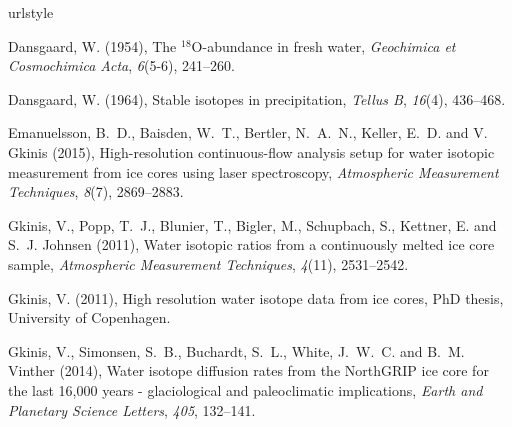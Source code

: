 \documentclass[draft, jgrga]{AGUTeX}
\begin{document}
\begin{article}




\begin{thebibliography}{}

\providecommand{\natexlab}[1]{#1}
\expandafter\ifx\csname urlstyle\endcsname\relax
  \providecommand{\doi}[1]{doi:\discretionary{}{}{}#1}\else
  \providecommand{\doi}{doi:\discretionary{}{}{}\begingroup
  \urlstyle{rm}\Url}\fi


 Dansgaard, W. (1954),
The $^{18}${O}-abundance in fresh water,
\textit{Geochimica et Cosmochimica Acta}, \textit{6}(5-6), 241--260.

 Dansgaard, W. (1964),
Stable isotopes in precipitation,
\textit{Tellus B}, \textit{16}(4), 436--468.

Emanuelsson, B.~D., Baisden, W.~T., Bertler, N.~A.~N., Keller, E.~D. and V. Gkinis (2015),
High-resolution continuous-flow analysis setup for water isotopic measurement from ice cores using laser spectroscopy,
\textit{Atmospheric Measurement Techniques}, \textit{8}(7), 2869--2883.

Gkinis, V., Popp, T.~J., Blunier, T., Bigler, M., Schupbach, S., Kettner, E. and S.~J. Johnsen (2011),
Water isotopic ratios from a continuously melted ice core sample,
\textit{Atmospheric Measurement Techniques}, \textit{4}(11), 2531--2542.

Gkinis, V. (2011),
{ High resolution water isotope data from ice cores},
PhD thesis, University of Copenhagen.

Gkinis, V., Simonsen, S.~B., Buchardt, S.~L., White, J.~W.~C. and  B.~M. Vinther (2014),
{Water isotope diffusion rates from the NorthGRIP ice core for the last 16,000 years - glaciological and paleoclimatic implications},
\textit{Earth and Planetary Science Letters}, \textit{405}, 132--141.


\end{thebibliography}
\end{article}
\end{document}
